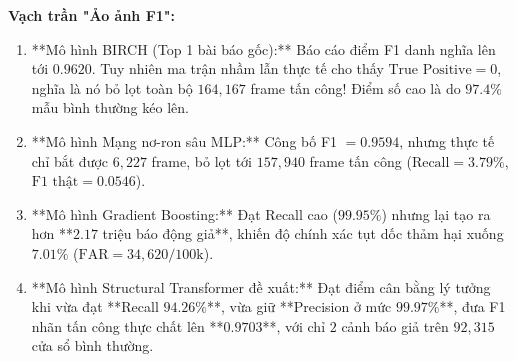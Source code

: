 \documentclass[12pt, a4paper, reqno, oneside]{book}
\begin{document}
\begin{table}[htbp]
\centering
\caption{Đối sánh Trực diện trên Tác vụ Chuyển giao Xe Lạ (Chevrolet Silverado)}
\label{tab:lampe_comparison}
\small
{}%
\end{table}

\textbf{Vạch trần "Ảo ảnh F1":}
\begin{enumerate}
    \item **Mô hình BIRCH (Top 1 bài báo gốc):** Báo cáo điểm F1 danh nghĩa lên tới $0.9620$. Tuy nhiên ma trận nhầm lẫn thực tế cho thấy $\text{True Positive} = 0$, nghĩa là nó bỏ lọt toàn bộ $164,167$ frame tấn công! Điểm số cao là do $97.4\%$ mẫu bình thường kéo lên.
    \item **Mô hình Mạng nơ-ron sâu MLP:** Công bố F1 $= 0.9594$, nhưng thực tế chỉ bắt được $6,227$ frame, bỏ lọt tới $157,940$ frame tấn công ($\text{Recall} = 3.79\%$, $\text{F1 thật} = 0.0546$).
    \item **Mô hình Gradient Boosting:** Đạt Recall cao ($99.95\%$) nhưng lại tạo ra hơn **$2.17$ triệu báo động giả**, khiến độ chính xác tụt dốc thảm hại xuống $7.01\%$ ($\text{FAR} = 34,620 / 100\text{k}$).
    \item **Mô hình Structural Transformer đề xuất:** Đạt điểm cân bằng lý tưởng khi vừa đạt **Recall $94.26\%$**, vừa giữ **Precision ở mức $99.97\%$**, đưa F1 nhãn tấn công thực chất lên **$0.9703$**, với chỉ $2$ cảnh báo giả trên $92,315$ cửa sổ bình thường.
\end{enumerate}
\end{document}
